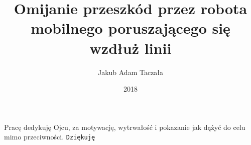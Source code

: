 \documentclass[12pt, eng, oneside, openany, final]{mgr}
\author{Jakub Adam Taczała}
\title{Omijanie przeszkód przez robota mobilnego poruszającego się wzdłuż linii}
\date{2018}
\begin{document}
\maketitle
\dedication{6cm}{Pracę dedykuję Ojcu, za motywację, wytrwałość i pokazanie jak dążyć do celu mimo przeciwności. \texttt{Dziękuję}}

\setcounter{tocdepth}{1}
\tableofcontents
\listoffigures
\listoftables

\newpage


%



\end{document}
